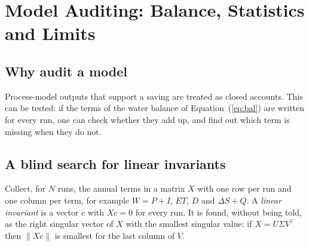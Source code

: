 \chapter{Model Auditing: Balance, Statistics and Limits}\label{chap:04}
\label{ch:audit}
\section{Why audit a model}
Process-model outputs that support a saving are treated as closed accounts. This can be tested: if the terms of the water balance of Equation~(\ref{eq:bal}) are written for every run, one can check whether they add up, and find out which term is missing when they do not.

\section{A blind search for linear invariants}
Collect, for $N$ runs, the annual terms in a matrix $X$ with one row per run and one column per term, for example $W=P+I$, $ET$, $D$ and $\Delta S+Q$. A \emph{linear invariant} is a vector $c$ with $Xc=0$ for every run. It is found, without being told, as the right singular vector of $X$ with the smallest singular value: if $X=U\Sigma V^{\top}$ then $\|Xc\|$ is smallest for the last column of $V$.




